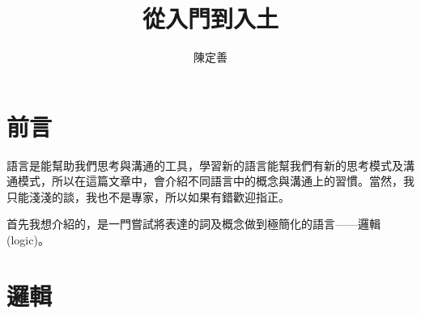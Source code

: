 \documentclass{article}
\title{從入門到入土}
\author{陳定善}
\date{}
\begin{document}
\maketitle
\section{前言}
語言是能幫助我們思考與溝通的工具，學習新的語言能幫我們有新的思考模式及溝通模式，所以在這篇文章中，會介紹不同語言中的概念與溝通上的習慣。當然，我只能淺淺的談，我也不是專家，所以如果有錯歡迎指正。\par
首先我想介紹的，是一門嘗試將表達的詞及概念做到極簡化的語言——邏輯(logic)。
\section{邏輯}
\end{document}
